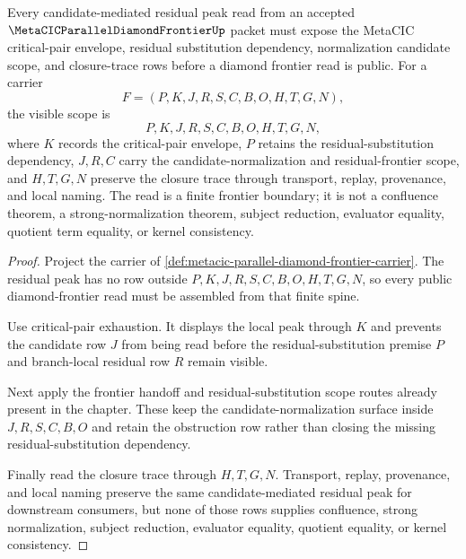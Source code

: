 \begin{theorem}
\label{thm:metacic-parallel-diamond-frontier-residual-peak-scope}
Every candidate-mediated residual peak read from an accepted $\MetaCICParallelDiamondFrontierUp$ packet must expose the MetaCIC critical-pair envelope, residual substitution dependency, normalization candidate scope, and closure-trace rows before a diamond frontier read is public. For a carrier
$$
F=(P,K,J,R,S,C,B,O,H,T,G,N),
$$
the visible scope is
$$
P,K,J,R,S,C,B,O,H,T,G,N,
$$
where $K$ records the critical-pair envelope, $P$ retains the residual-substitution dependency, $J,R,C$ carry the candidate-normalization and residual-frontier scope, and $H,T,G,N$ preserve the closure trace through transport, replay, provenance, and local naming. The read is a finite frontier boundary; it is not a confluence theorem, a strong-normalization theorem, subject reduction, evaluator equality, quotient term equality, or kernel consistency.
\end{theorem}
\begin{proof}
Project the carrier of \autoref{def:metacic-parallel-diamond-frontier-carrier}. The residual peak has no row outside $P,K,J,R,S,C,B,O,H,T,G,N$, so every public diamond-frontier read must be assembled from that finite spine.

Use critical-pair exhaustion. It displays the local peak through $K$ and prevents the candidate row $J$ from being read before the residual-substitution premise $P$ and branch-local residual row $R$ remain visible.

Next apply the frontier handoff and residual-substitution scope routes already present in the chapter. These keep the candidate-normalization surface inside $J,R,S,C,B,O$ and retain the obstruction row rather than closing the missing residual-substitution dependency.

Finally read the closure trace through $H,T,G,N$. Transport, replay, provenance, and local naming preserve the same candidate-mediated residual peak for downstream consumers, but none of those rows supplies confluence, strong normalization, subject reduction, evaluator equality, quotient equality, or kernel consistency.
\end{proof}

